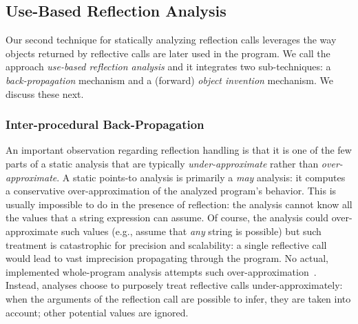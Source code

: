 \subsection{Use-Based Reflection Analysis}
\label{reflection/sec:use-based}

Our second technique for statically analyzing reflection calls
leverages the way objects returned by reflective calls are later used
in the program.  We call the approach \emph{use-based reflection
  analysis} and it integrates two sub-techniques: a
\emph{back-propagation} mechanism and a (forward) \emph{object
  invention} mechanism.  We discuss these next.

\subsubsection{Inter-procedural Back-Propagation}
\label{reflection/sec:back-propagation}

An important observation regarding reflection handling is that it is
one of the few parts of a static analysis that are typically
\emph{under-approximate} rather than \emph{over-approximate}.  A
static points-to analysis is primarily a \emph{may} analysis: it
computes a conservative over-approximation of the analyzed program's
behavior. This is usually impossible to do in the presence of
reflection: the analysis cannot know all the values that a string
expression can assume. Of course, the analysis could over-approximate
such values (e.g., assume that \emph{any} string is possible) but such
treatment is catastrophic for precision and scalability: a single
reflective call would lead to vast imprecision propagating through the
program. No actual, implemented whole-program analysis attempts such
over-approximation~\cite{soundiness15}. Instead, analyses choose to
purposely treat reflective calls under-approximately: when the
arguments of the reflection call are possible to infer, they are taken
into account; other potential values are ignored.

